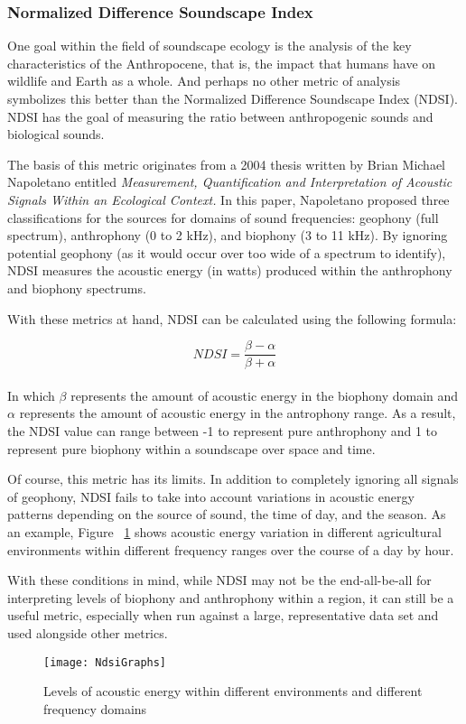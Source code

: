 \subsubsection{Normalized Difference Soundscape Index}
One goal within the field of soundscape ecology is the analysis of the key characteristics of the Anthropocene, that is, the impact that humans have on wildlife and Earth as a whole. And perhaps no other metric of analysis symbolizes this better than the Normalized Difference Soundscape Index (NDSI). NDSI has the goal of measuring the ratio between anthropogenic sounds and biological sounds.\par
The basis of this metric originates from a 2004 thesis written by Brian Michael Napoletano entitled \textit{Measurement, Quantification and Interpretation of Acoustic Signals Within an Ecological Context.} In this paper, Napoletano proposed three classifications for the sources for domains of sound frequencies: geophony (full spectrum), anthrophony (0 to 2 kHz), and biophony (3 to 11 kHz).\cite{napoletano} By ignoring potential geophony (as it would occur over too wide of a spectrum to identify), NDSI measures the acoustic energy (in watts) produced within the anthrophony and biophony spectrums.\par
With these metrics at hand, NDSI can be calculated using the following formula:\par

\begin{equation}
  NDSI = \frac{\beta - \alpha}{\beta + \alpha}
\end{equation} \\[-24pt]

In which \(\beta\) represents the amount of acoustic energy in the biophony domain and \(\alpha\) represents the amount of acoustic energy in the antrophony range. As a result, the NDSI value can range between -1 to represent pure anthrophony and 1 to represent pure biophony within a soundscape over space and time.\cite{gage}\par
Of course, this metric has its limits. In addition to completely ignoring all signals of geophony, NDSI fails to take into account variations in acoustic energy patterns depending on the source of sound, the time of day, and the season. As an example, Figure ~\ref{fig:ndsiGraphs} shows acoustic energy variation in different agricultural environments within different frequency ranges over the course of a day by hour.\par
With these conditions in mind, while NDSI may not be the end-all-be-all for interpreting levels of biophony and anthrophony within a region, it can still be a useful metric, especially when run against a large, representative data set and used alongside other metrics.\par

\begin{figure}
  \begin{center}
    \texttt{[image: NdsiGraphs]}
  \end{center}
  \caption{Levels of acoustic energy within different environments and different frequency domains}
  \label{fig:ndsiGraphs}
\end{figure}

